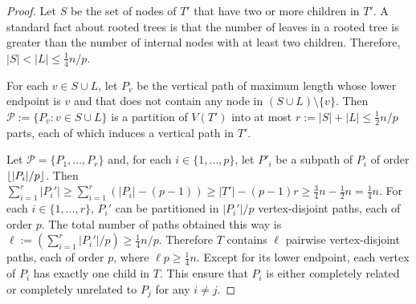 \documentclass[kpfonts,lotsofwhite]{patmorin}
\DeclarePairedDelimiter{\floor}{\lfloor}{\rfloor}
\renewcommand{\ge}{\geqslant}
\renewcommand{\le}{\leqslant}
\theoremstyle{plain}
\theoremstyle{definition}
\begin{document}
\begin{proof}
  Let $S$ be the set of nodes of $T'$ that have two or more children in $T'$.  A standard fact about rooted trees is that the number of leaves in a rooted tree is greater than the number of internal nodes with at least two children.  Therefore, $|S|<|L|\le \tfrac{1}{4}n/p$.

  For each $v\in S\cup L$, let $P_v$ be the vertical path of maximum length whose lower endpoint is $v$ and that does not contain any node in $(S\cup L)\setminus \{v\}$.  Then $\mathcal{P}:=\{P_v:v\in S\cup L\}$ is a partition of $V(T')$ into at most $r:=|S|+|L|\le \tfrac{1}{2}n/p$ parts, each of which induces a vertical path in $T'$.

  Let $\mathcal{P}=\{P_1,\ldots,P_r\}$ and, for each $i\in\{1,\ldots,p\}$, let $P'_i$ be a subpath of $P_i$ of order $\floor{|P_i|/p}$.  Then $\sum_{i=1}^r |P_i'|\ge \sum_{i=1}^r (|P_i|-(p-1)) \ge |T'| - (p-1)r\ge \tfrac{3}{4}n-\tfrac{1}{2}n=\tfrac{1}{4}n$. For each $i\in\{1,\ldots,r\}$, $P_i'$ can be partitioned in $|P_i'|/p$ vertex-disjoint paths, each of order $p$.  The total number of paths obtained this way is $\ell := (\sum_{i=1}^r |P_i'|/p) \ge \tfrac{1}{4}n/p$.  Therefore $T$ contains $\ell$ pairwise vertex-disjoint paths, each of order $p$, where $\ell p \ge \tfrac{1}{4}n$.  Except for its lower endpoint, each vertex of $P_i$ has exactly one child in $T$.  This ensure that $P_i$ is either completely related or completely unrelated to $P_j$ for any $i\neq j$.
\end{proof}
\end{document}
